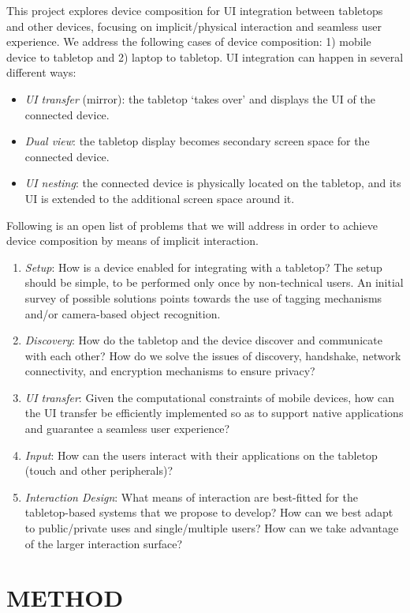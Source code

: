 This project explores device composition for UI integration between tabletops and other devices, focusing on implicit/physical interaction and seamless user experience.
We address the following cases of device composition: 1) mobile device to tabletop and 2) laptop to tabletop.
UI integration can happen in several different ways:
\begin{itemize}
\item{\emph{UI transfer} (mirror): the tabletop `takes over' and displays the UI of the connected device.}
\item{\emph{Dual view}: the tabletop display becomes secondary screen space for the connected device.}
\item{\emph{UI nesting}: the connected device is physically located on the tabletop, and its UI is extended to the additional screen space around it.}
\end{itemize}

Following is an open list of problems that we will address in order to achieve device composition by means of implicit interaction.
\begin{enumerate}
\item{\emph{Setup}: How is a device enabled for integrating with a tabletop?
The setup should be simple, to be performed only once by non-technical users.
An initial survey of possible solutions points towards the use of tagging mechanisms and/or camera-based object recognition.}
\item{\emph{Discovery}: How do the tabletop and the device discover and communicate with each other?
How do we solve the issues of discovery, handshake, network connectivity, and encryption mechanisms to ensure privacy?}
\item{\emph{UI transfer}: Given the computational constraints of mobile devices, how can the UI transfer be efficiently implemented so as to support native applications and guarantee a seamless user experience?}
\item{\emph{Input}: How can the users interact with their applications on the tabletop (touch and other peripherals)?}
\item{\emph{Interaction Design}: What means of interaction are best-fitted for the tabletop-based systems that we propose to develop?
How can we best adapt to public/private uses and single/multiple users?
How can we take advantage of the larger interaction surface?}
\end{enumerate}

\section{METHOD}

